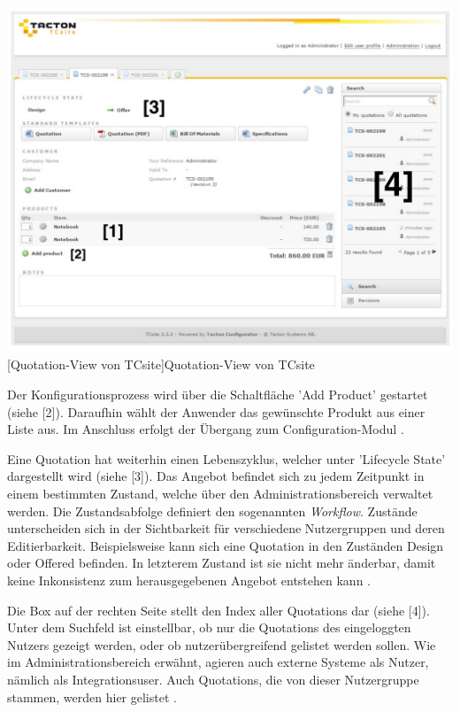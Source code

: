 \documentclass[11pt, a4paper, titlepage, listof=totoc, bibliography=totoc, index=totoc, twoside, openright, headings=normal]{scrreprt}
\begin{document}
\vspace{1em}
\begin{minipage}{\linewidth}
	\centering
	\includegraphics[width=0.95\linewidth]{Abbildungen/tcsiteQuotationNumbered.pdf}
	[Quotation-View von TCsite]{Quotation-View von TCsite}
	\label{fig:tcsiteQuotationNumbered}
\end{minipage}
\vspace{1em}

Der Konfigurationsprozess wird über die Schaltfläche 'Add Product' gestartet (siehe [2]). Daraufhin wählt der Anwender das gewünschte Produkt aus einer Liste aus. Im Anschluss erfolgt der Übergang zum Configuration-Modul \citep{tactonTCsiteReferenceManual}.

Eine Quotation hat weiterhin einen Lebenszyklus, welcher unter 'Lifecycle State' dargestellt wird (siehe [3]). Das Angebot befindet sich zu jedem Zeitpunkt in einem bestimmten Zustand, welche über den Administrationsbereich verwaltet werden. Die Zustandsabfolge definiert den sogenannten \emph{Workflow}. Zustände unterscheiden sich in der Sichtbarkeit für verschiedene Nutzergruppen und deren Editierbarkeit. Beispielsweise kann sich eine Quotation in den Zuständen \glqq Design\grqq{} oder \glqq Offered\grqq{} befinden. In letzterem Zustand ist sie nicht mehr änderbar, damit keine Inkonsistenz zum herausgegebenen Angebot entstehen kann \citep{tactonTCsiteReferenceManual}.

Die Box auf der rechten Seite stellt den Index aller Quotations dar (siehe [4]). Unter dem Suchfeld ist einstellbar, ob nur die Quotations des eingeloggten Nutzers gezeigt werden, oder ob nutzerübergreifend gelistet werden sollen. Wie im Administrationsbereich erwähnt, agieren auch externe Systeme als Nutzer, nämlich als Integrationsuser. Auch Quotations, die von dieser Nutzergruppe stammen, werden hier gelistet \citep{tactonTCsiteReferenceManual}.
\end{document}
